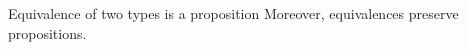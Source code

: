 \begin{code}
\AgdaSymbol{)}\<%
\\
\>[4][@{}l@{\AgdaIndent{0}}]%
\>[6]\<%
\\
\>[6][@{}l@{\AgdaIndent{0}}]%
\>[8]\AgdaSpace{}%
\AgdaSymbol{:}\AgdaSpace{}%
\AgdaSpace{}%
\<%
\\
%
\>[8]\AgdaSpace{}%
\AgdaSymbol{=}\AgdaSpace{}%
\AgdaSpace{}%
\AgdaSymbol{(}\AgdaSpace{}%
\AgdaSymbol{(}\AgdaSpace{}%
\AgdaOperator{\AgdaInductiveConstructor{,}}\AgdaSpace{}%
\AgdaSymbol{))}\<%
\\
\>[0]\AgdaSpace{}%
\AgdaSpace{}%
\<%
\end{code}


Equivalence of two types is a proposition
Moreover, equivalences preserve propositions.

